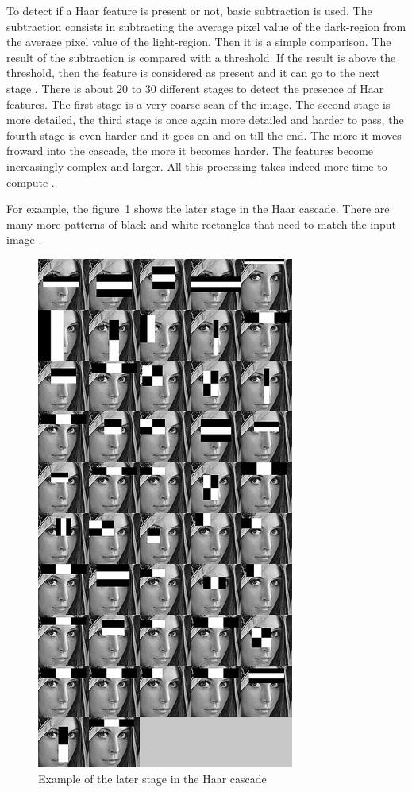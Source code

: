 \noindent To detect if a Haar feature is present or not, basic subtraction is used. The subtraction consists in subtracting the average pixel value of the dark-region from the average pixel value of the light-region. Then it is a simple comparison. The result of the subtraction is compared with a threshold. If the result is above the threshold, then the feature is considered as present and it can go to the next stage \cite{HEW07}. There is about 20 to 30 different stages to detect the presence of Haar features. The first stage is a very coarse scan of the image. The second stage is more detailed, the third stage is once again more detailed and harder to pass, the fourth stage is even harder and it goes on and on till the end. The more it moves froward into the cascade, the more it becomes harder. The features become increasingly complex and larger. All this processing takes indeed more time to compute \cite{HAR12}.
\newline

\noindent For example, the figure~\ref{haar_feature_later_stage} shows the later stage in the Haar cascade. There are many more patterns of black and white rectangles that need to match the input image \cite{HAR12}.
\newline

\begin{figure}[!h]
\begin{center}
\noindent \includegraphics[scale=0.8]{figures/haar_feature_later_stage} 
\newline
\caption{Example of the later stage in the Haar cascade}
\label{haar_feature_later_stage}
\end{center} 
\end{figure}

